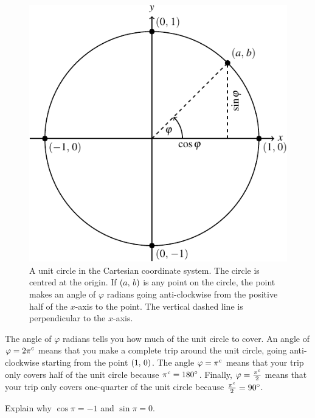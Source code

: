 \documentclass[a4paper,oneside,12pt]{article}
\begin{document}
\begin{figure}[!htbp]
\centering
\includegraphics[scale=1.1]{image/04/unit-circle.pdf}
\caption{%
  A unit circle in the Cartesian coordinate system.  The circle is
  centred at the origin.  If $\tuple{a}{b}$ is any point on the
  circle, the point makes an angle of $\varphi$ radians going
  anti-clockwise from the positive half of the $x$-axis to the point.
  The vertical dashed line is perpendicular to the $x$-axis.
}
\label{fig:point_on_unit_circle}
\end{figure}

The angle of $\varphi$ radians tells you how much of the unit circle
to cover.  An angle of $\varphi = \radian{2\pi}$ means that you make a
complete trip around the unit circle, going anti-clockwise starting
from the point $\tuple{1}{0}$.  The angle $\varphi = \radian{\pi}$
means that your trip only covers half of the unit circle because
$\radian{\pi} = \degree{180}$.  Finally,
$\varphi = \frac{\radian{\pi}}{2}$ means that your trip only covers
one-quarter of the unit circle because
$\frac{\radian{\pi}}{2} = \degree{90}$.

\begin{exercise}
Explain why $\cos\pi = -1$ and $\sin\pi = 0$.
\end{exercise}

\end{document}
